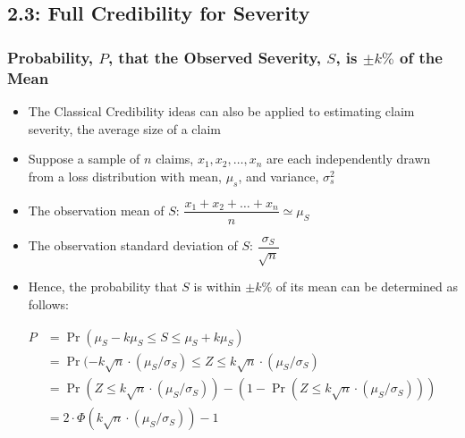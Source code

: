 \documentclass[
]{article}
\begin{document}
\hypertarget{full-credibility-for-severity}{%
\subsection{2.3: Full Credibility for
Severity}\label{full-credibility-for-severity}}

\begin{blue}

\hypertarget{probability-p-that-the-observed-severity-s-is-pm-k-of-the-mean}{%
\subsubsection{\texorpdfstring{Probability, \(P\), that the Observed
Severity, \(S\), is \(\pm k\%\) of the
Mean}{Probability, P, that the Observed Severity, S, is \textbackslash pm k\textbackslash\% of the Mean}}\label{probability-p-that-the-observed-severity-s-is-pm-k-of-the-mean}}

\begin{itemize}
\item
  The Classical Credibility ideas can also be applied to estimating
  claim severity, the average size of a claim
\item
  Suppose a sample of \(n\) claims, \(x_1,x_2,\dots,x_n\) are each
  independently drawn from a loss distribution with mean, \(\mu_s\), and
  variance, \(\sigma_s^2\)
\item
  The observation mean of \(S\):
  \(\dfrac{x_1+x_2+\dots+x_n}{n} \simeq \mu_S\)
\item
  The observation standard deviation of \(S\):
  \(\dfrac{\sigma_S}{\sqrt{n}}\)
\item
  Hence, the probability that \(S\) is within \(\pm k\%\) of its mean
  can be determined as follows:
\end{itemize}

\[
  \begin{align}
    P &= \Pr(\mu_S-k\mu_S \le S \le \mu_S + k\mu_S) \\
      &= \Pr(-k\sqrt{n} \cdot (\mu_S/\sigma_S) \le Z \le k\sqrt{n} \cdot (\mu_S/\sigma_S) \\
      &= \Pr(Z \le k\sqrt{n} \cdot (\mu_S/\sigma_S)) - (1 - \Pr(Z \le k\sqrt{n} \cdot (\mu_S/\sigma_S))) \\
      &= 2 \cdot \Phi(k\sqrt{n} \cdot (\mu_S/\sigma_S)) - 1
  \end{align}
\]

\end{blue}
\end{document}
